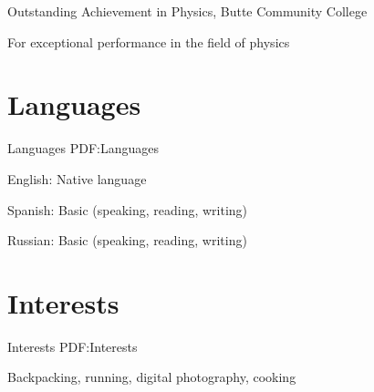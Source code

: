 \documentclass[letterpaper,MMMyyyy,nonstop]{simpleresumecv}
\begin{document}
\begin{body}
\Gap
\BulletItem
Outstanding Achievement in Physics,
Butte Community College
\hfill
{}
\begin{detail}
\SubItem
For exceptional performance in the field of physics
\end{detail}











\section
{Languages}
{Languages}
{PDF:Languages}

\BulletItem
English: Native language

\GapNoBreak
\BulletItem
Spanish: Basic (speaking, reading, writing)

\GapNoBreak
\BulletItem
Russian: Basic (speaking, reading, writing)


\section
{Interests}
{Interests}
{PDF:Interests}

Backpacking,
running,
digital photography,
cooking



\end{body}
\end{document}
